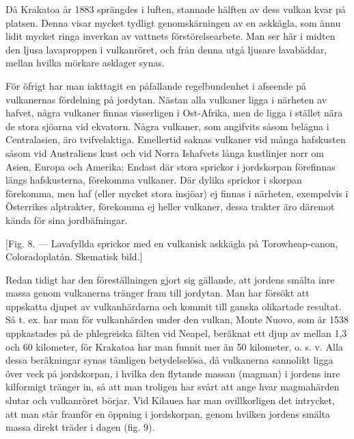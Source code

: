 \documentclass[a4paper, 12pt, oneside, swedish]{article}
\begin{document}
Då Krakatoa år 1883 sprängdes i luften, stannade hälften av dess vulkan kvar på platsen. Denna visar mycket tydligt genomskärningen av en askkägla, som ännu lidit mycket ringa inverkan av vattnets förstörelsearbete. Man ser här i midten den ljusa lavaproppen i vulkanröret, och från denna utgå ljusare lavabäddar, mellan hvilka mörkare asklager synas.

För öfrigt har man iakttagit en påfallande regelbundenhet i afseende på vulkanernas fördelning på jordytan. Nästan alla vulkaner ligga i närheten av hafvet, några vulkaner finnas visserligen i Ost-Afrika, men de ligga i stället nära de stora sjöarna vid ekvatorn. Några vulkaner, som angifvits såsom belägna i Centralasien, äro tvifvelaktiga. Emellertid saknas vulkaner vid många hafskusten såsom vid Australiens kust och vid Norra Ishafvets långa kustlinjer norr om Asien, Europa och Amerika: Endast där stora sprickor i jordskorpan förefinnas längs hafskusterna, förekomma vulkaner. Där dylika sprickor i skorpan förekomma, men haf (eller mycket stora insjöar) ej finnas i närheten, exempelvis i Österrikes alptrakter, förekomma ej heller vulkaner, dessa trakter äro däremot kända för sina jordbäfningar.

[Fig. 8. --- Lavafyllda sprickor med en vulkanisk askkägla på Torowheap-canon, Coloradoplatån. Skematisk bild.]

Redan tidigt har den föreställningen gjort sig gällande, att jordens smälta inre massa genom vulkanerna tränger fram till jordytan. Man har försökt att uppskatta djupet av vulkanhärdarna och kommit till ganska olikartade resultat. Så t. ex. har man för vulkanhärden under den vulkan, Monte Nuovo, som år 1538 uppkastades på de phlegreiska fälten vid Neapel, beräknat ett djup av mellan 1,3 och 60 kilometer, för Krakatoa har man funnit mer än 50 kilometer, o. s. v. Alla dessa beräkningar synas tämligen betydelselösa, då vulkanerna sannolikt ligga över veck på jordskorpan, i hvilka den flytande massan (magman) i jordens inre kilformigt tränger in, så att man troligen har svårt att ange hvar magmahärden slutar och vulkanröret börjar. Vid Kilauea har man ovillkorligen det intrycket, att man står framför en öppning i jordskorpan, genom hvilken jordens smälta massa direkt träder i dagen (fig. 9).
\end{document}
